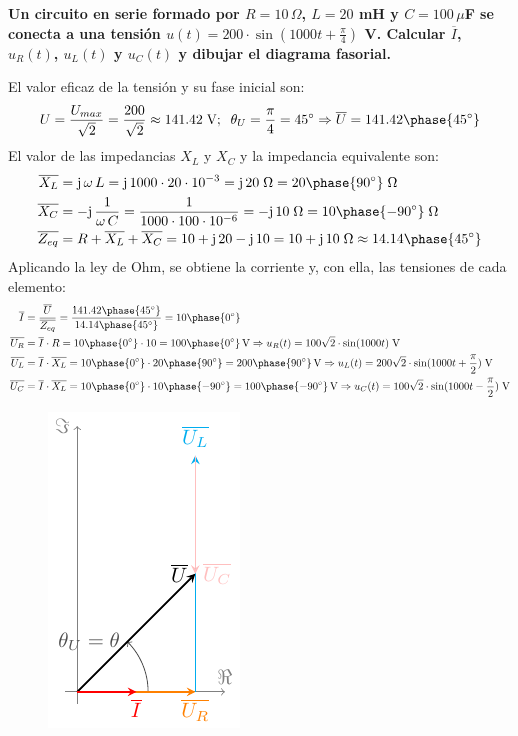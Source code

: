 \documentclass[11pt]{book} %
\begin{document}
	\vspace{4mm}
	\begin{example}\label{ej.2-3}
		\textbf{Un circuito en serie formado por $R=10\,\Omega$, $L=20$ mH y $C=100\,\mu$F se conecta a una tensión $u(t)=200\cdot\sin(1000t+\frac{\pi}{4})$ V. Calcular $\overline{I}$, ${u_R(t)}$, $u_L(t)$ y $u_C(t)$ y dibujar el diagrama fasorial.}
		
		El valor eficaz de la tensión y su fase inicial son:
		\begin{equation*}
			U=\dfrac{U_{max}}{\sqrt{2}}=\dfrac{200}{\sqrt{2}}\approx 141.42\;\text{V};\;\;\theta_U=\dfrac{\pi}{4}=45^\circ \Rightarrow \overline{U}=141.42\phase{45^\circ}
		\end{equation*}
		El valor de las impedancias $X_L$ y $X_C$ y la impedancia equivalente son:
		\begin{align*}
			\overline{X_L}&=\mathrm{j}\,\omega\,L=\mathrm{j}\,1000\cdot20\cdot 10^{-3}= \mathrm{j}\,20\;\Omega=20\phase{90^\circ}\;\Omega\\
			\overline{X_C}&=-\mathrm{j}\,\dfrac{1}{\omega\,C}=\dfrac{1}{1000\cdot100\cdot 10^{-6}}= -\mathrm{j}\,10\;\Omega=10\phase{-90^\circ}\;\Omega		\\
			\overline{Z_{eq}}&=R+\overline{X_L}+\overline{X_C}=10+\mathrm{j}\,20-\mathrm{j}\,10=10+\mathrm{j}\,10\;\Omega\approx 14.14\phase{45^\circ}
		\end{align*}
		Aplicando la ley de Ohm, se obtiene la corriente y, con ella, las tensiones de cada elemento:
		\begin{align*}
			\overline{I}&=\dfrac{\overline{U}}{\overline{Z_{eq}}}=\dfrac{141.42\phase{45^\circ}}{14.14\phase{45^\circ}}=10\phase{0^\circ}\\
			\overline{U_R}&=\overline{I}\cdot R=10\phase{0^\circ}\cdot 10=100\phase{0^\circ}\,\text{V}\Rightarrow u_R(t)=100\sqrt{2}\cdot\sin(1000t)\;\text{V}\\
			\overline{U_L}&=\overline{I}\cdot \overline{X_L}=10\phase{0^\circ}\cdot 20\phase{90^\circ}=200\phase{90^\circ}\,\text{V}\Rightarrow u_L(t)=200\sqrt{2}\cdot\sin(1000t+\frac{\pi}{2})\;\text{V}\\
			\overline{U_C}&=\overline{I}\cdot \overline{X_L}=10\phase{0^\circ}\cdot 10\phase{-90^\circ} =100\phase{-90^\circ}\,\text{V}\Rightarrow u_C(t)=100\sqrt{2}\cdot\sin(1000t-\frac{\pi}{2})\;\text{V}
		\end{align*}
		\begin{figure}[H]
			\centering
			\includegraphics[]{../figs/diagrama_fasorial_ejemplo2_3.pdf}

\end{figure}
\end{example}
\end{document}
